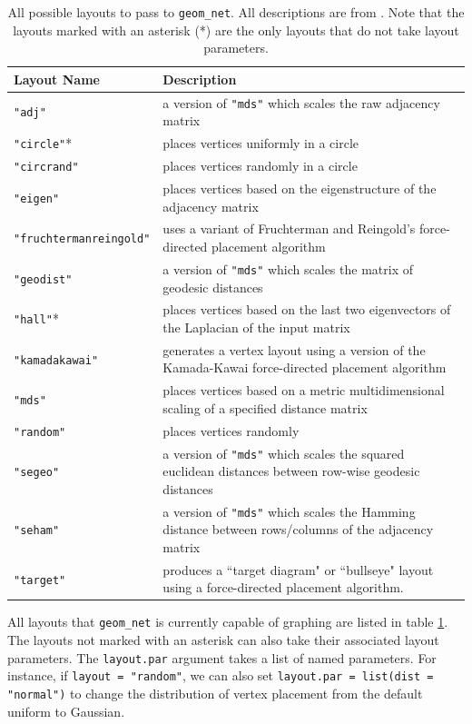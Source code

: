 \documentclass[11pt]{article}\usepackage[]{graphicx}\usepackage[]{color}
\begin{document}
\begin{table}
\centering
\begin{tabular}{l|p{10cm}}
Layout Name & Description \\
\hline \hline
\texttt{"adj"} & a version of \texttt{"mds"} which scales the raw adjacency matrix \\
\texttt{"circle"}* & places vertices uniformly in a circle \\
\texttt{"circrand"} & places vertices randomly in a circle \\
\texttt{"eigen"} & places vertices based on the eigenstructure of the adjacency matrix \\
\texttt{"fruchtermanreingold"} & uses a variant of Fruchterman and Reingold's force-directed placement algorithm \\
\texttt{"geodist"} & a version of \texttt{"mds"} which scales the matrix of geodesic distances \\
\texttt{"hall"}* &  places vertices based on the last two eigenvectors of the Laplacian of the input matrix \\
\texttt{"kamadakawai"} & generates a vertex layout using a version of the Kamada-Kawai force-directed placement algorithm \\
\texttt{"mds"}  & places vertices based on a metric multidimensional scaling of a specified distance matrix \\
\texttt{"random"} & places vertices randomly \\
\texttt{"segeo"} & a version of \texttt{"mds"} which scales the squared euclidean distances between row-wise geodesic distances \\
\texttt{"seham"} & a version of \texttt{"mds"} which scales the Hamming distance between rows/columns of the adjacency matrix \\
\texttt{"target"} & produces a ``target diagram" or ``bullseye" layout using a force-directed placement algorithm.
\end{tabular}
\caption{All possible layouts to pass to \texttt{geom\_net}.  All descriptions are from \citet{sna}.  Note that the layouts marked with an asterisk (*) are the only layouts that do not take layout parameters.}
\label{table:layouts}
\end{table}

All layouts that \texttt{geom\_net} is currently capable of graphing are listed in table \ref{table:layouts}. The layouts not marked with an asterisk can also take their associated layout parameters.  The \texttt{layout.par} argument takes a list of named parameters.  For instance, if \texttt{layout = "random"}, we can also set \texttt{layout.par = list(dist = "normal")} to change the distribution of vertex placement from the default uniform to Gaussian.
\end{document}
